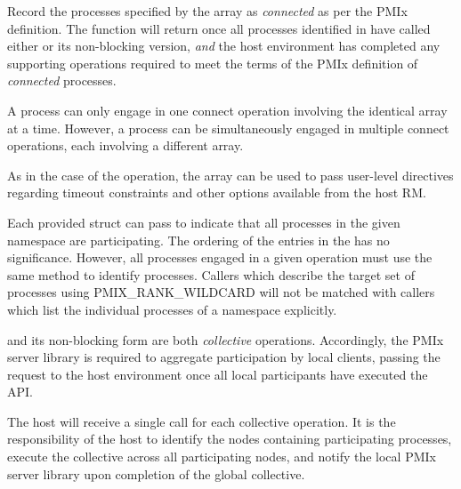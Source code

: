 \descr

Record the processes specified by the  array as \textit{connected} as per the \ac{PMIx} definition. The function will return once all processes identified in  have called either  or its non-blocking version, \textit{and} the host environment has completed any supporting operations required to meet the terms of the \ac{PMIx} definition of \textit{connected} processes.

A process can only engage in one connect operation involving the identical  array at a time.
However, a process can be simultaneously engaged in multiple connect operations, each involving a different  array.

As in the case of the  operation, the  array can be used to pass user-level directives regarding timeout constraints and other options available from the host \ac{RM}.

Each provided  struct can pass  to indicate that all processes in the given namespace are participating.
The ordering of the entries in the  has no significance.  However, all processes engaged in a given
operation must use the same method to identify processes.  Callers which describe
the target set of processes using PMIX_RANK_WILDCARD will not be matched with
callers which list the individual processes of a namespace explicitly.

\adviceimplstart
{} and its non-blocking form are both \emph{collective} operations. Accordingly, the \ac{PMIx} server library is required to aggregate participation by local clients, passing the request to the host environment once all local participants have executed the \ac{API}.
\adviceimplend

\advicermstart
The host will receive a single call for each collective operation. It is the responsibility of the host to identify the nodes containing participating processes, execute the collective across all participating nodes, and notify the local \ac{PMIx} server library upon completion of the global collective.
\advicermend


\subsection{}

